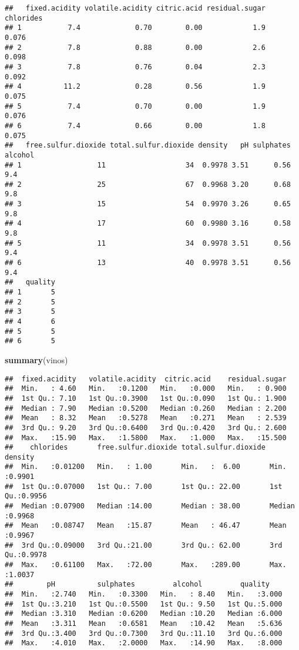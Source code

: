 \documentclass[
]{article}
\newenvironment{Shaded}{\begin{snugshade}}{\end{snugshade}}
\newcommand{\FunctionTok}[1]{\textcolor[rgb]{0.13,0.29,0.53}{\textbf{#1}}}
\newcommand{\NormalTok}[1]{#1}
\begin{document}
\begin{verbatim}
##   fixed.acidity volatile.acidity citric.acid residual.sugar chlorides
## 1           7.4             0.70        0.00            1.9     0.076
## 2           7.8             0.88        0.00            2.6     0.098
## 3           7.8             0.76        0.04            2.3     0.092
## 4          11.2             0.28        0.56            1.9     0.075
## 5           7.4             0.70        0.00            1.9     0.076
## 6           7.4             0.66        0.00            1.8     0.075
##   free.sulfur.dioxide total.sulfur.dioxide density   pH sulphates alcohol
## 1                  11                   34  0.9978 3.51      0.56     9.4
## 2                  25                   67  0.9968 3.20      0.68     9.8
## 3                  15                   54  0.9970 3.26      0.65     9.8
## 4                  17                   60  0.9980 3.16      0.58     9.8
## 5                  11                   34  0.9978 3.51      0.56     9.4
## 6                  13                   40  0.9978 3.51      0.56     9.4
##   quality
## 1       5
## 2       5
## 3       5
## 4       6
## 5       5
## 6       5
\end{verbatim}

\begin{Shaded}
\begin{Highlighting}[]
\FunctionTok{summary}\NormalTok{(vinos)}
\end{Highlighting}
\end{Shaded}

\begin{verbatim}
##  fixed.acidity   volatile.acidity  citric.acid    residual.sugar  
##  Min.   : 4.60   Min.   :0.1200   Min.   :0.000   Min.   : 0.900  
##  1st Qu.: 7.10   1st Qu.:0.3900   1st Qu.:0.090   1st Qu.: 1.900  
##  Median : 7.90   Median :0.5200   Median :0.260   Median : 2.200  
##  Mean   : 8.32   Mean   :0.5278   Mean   :0.271   Mean   : 2.539  
##  3rd Qu.: 9.20   3rd Qu.:0.6400   3rd Qu.:0.420   3rd Qu.: 2.600  
##  Max.   :15.90   Max.   :1.5800   Max.   :1.000   Max.   :15.500  
##    chlorides       free.sulfur.dioxide total.sulfur.dioxide    density      
##  Min.   :0.01200   Min.   : 1.00       Min.   :  6.00       Min.   :0.9901  
##  1st Qu.:0.07000   1st Qu.: 7.00       1st Qu.: 22.00       1st Qu.:0.9956  
##  Median :0.07900   Median :14.00       Median : 38.00       Median :0.9968  
##  Mean   :0.08747   Mean   :15.87       Mean   : 46.47       Mean   :0.9967  
##  3rd Qu.:0.09000   3rd Qu.:21.00       3rd Qu.: 62.00       3rd Qu.:0.9978  
##  Max.   :0.61100   Max.   :72.00       Max.   :289.00       Max.   :1.0037  
##        pH          sulphates         alcohol         quality     
##  Min.   :2.740   Min.   :0.3300   Min.   : 8.40   Min.   :3.000  
##  1st Qu.:3.210   1st Qu.:0.5500   1st Qu.: 9.50   1st Qu.:5.000  
##  Median :3.310   Median :0.6200   Median :10.20   Median :6.000  
##  Mean   :3.311   Mean   :0.6581   Mean   :10.42   Mean   :5.636  
##  3rd Qu.:3.400   3rd Qu.:0.7300   3rd Qu.:11.10   3rd Qu.:6.000  
##  Max.   :4.010   Max.   :2.0000   Max.   :14.90   Max.   :8.000
\end{verbatim}
\end{document}
